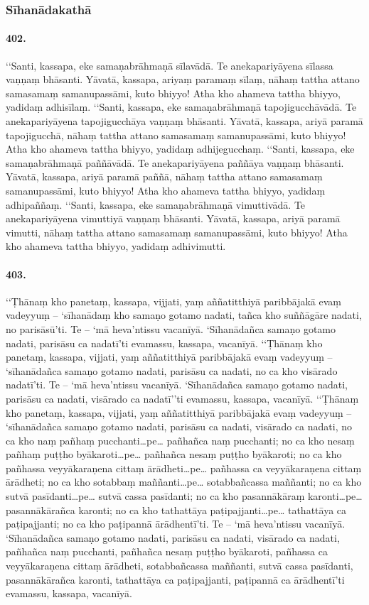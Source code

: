 \subsubsection{Sīhanādakathā}

\paragraph{402.} ‘‘Santi, kassapa, eke samaṇabrāhmaṇā sīlavādā. Te anekapariyāyena sīlassa vaṇṇaṃ bhāsanti. Yāvatā, kassapa, ariyaṃ paramaṃ sīlaṃ, nāhaṃ tattha attano samasamaṃ samanupassāmi, kuto bhiyyo! Atha kho ahameva tattha bhiyyo, yadidaṃ adhisīlaṃ. ‘‘Santi, kassapa, eke samaṇabrāhmaṇā tapojigucchāvādā. Te anekapariyāyena tapojigucchāya vaṇṇaṃ bhāsanti. Yāvatā, kassapa, ariyā paramā tapojigucchā, nāhaṃ tattha attano samasamaṃ samanupassāmi, kuto bhiyyo! Atha kho ahameva tattha bhiyyo, yadidaṃ adhijegucchaṃ. ‘‘Santi, kassapa, eke samaṇabrāhmaṇā paññāvādā. Te anekapariyāyena paññāya vaṇṇaṃ bhāsanti. Yāvatā, kassapa, ariyā paramā paññā, nāhaṃ tattha attano samasamaṃ samanupassāmi, kuto bhiyyo! Atha kho ahameva tattha bhiyyo, yadidaṃ adhipaññaṃ. ‘‘Santi, kassapa, eke samaṇabrāhmaṇā vimuttivādā. Te anekapariyāyena vimuttiyā vaṇṇaṃ bhāsanti. Yāvatā, kassapa, ariyā paramā vimutti, nāhaṃ tattha attano samasamaṃ samanupassāmi, kuto bhiyyo! Atha kho ahameva tattha bhiyyo, yadidaṃ adhivimutti.

\paragraph{403.} ‘‘Ṭhānaṃ kho panetaṃ, kassapa, vijjati, yaṃ aññatitthiyā paribbājakā evaṃ vadeyyuṃ – ‘sīhanādaṃ kho samaṇo gotamo nadati, tañca kho suññāgāre nadati, no parisāsū’ti. Te – ‘mā heva’ntissu vacanīyā. ‘Sīhanādañca samaṇo gotamo nadati, parisāsu ca nadatī’ti evamassu, kassapa, vacanīyā. ‘‘Ṭhānaṃ kho panetaṃ, kassapa, vijjati, yaṃ aññatitthiyā paribbājakā evaṃ vadeyyuṃ – ‘sīhanādañca samaṇo gotamo nadati, parisāsu ca nadati, no ca kho visārado nadatī’ti. Te – ‘mā heva’ntissu vacanīyā. ‘Sīhanādañca samaṇo gotamo nadati, parisāsu ca nadati, visārado ca nadatī’’ti evamassu, kassapa, vacanīyā. ‘‘Ṭhānaṃ kho panetaṃ, kassapa, vijjati, yaṃ aññatitthiyā paribbājakā evaṃ vadeyyuṃ – ‘sīhanādañca samaṇo gotamo nadati, parisāsu ca nadati, visārado ca nadati, no ca kho naṃ pañhaṃ pucchanti…pe… pañhañca naṃ pucchanti; no ca kho nesaṃ pañhaṃ puṭṭho byākaroti…pe… pañhañca nesaṃ puṭṭho byākaroti; no ca kho pañhassa veyyākaraṇena cittaṃ ārādheti…pe… pañhassa ca veyyākaraṇena cittaṃ ārādheti; no ca kho sotabbaṃ maññanti…pe… sotabbañcassa maññanti; no ca kho sutvā pasīdanti…pe… sutvā cassa pasīdanti; no ca kho pasannākāraṃ karonti…pe… pasannākārañca karonti; no ca kho tathattāya paṭipajjanti…pe… tathattāya ca paṭipajjanti; no ca kho paṭipannā ārādhentī’ti. Te – ‘mā heva’ntissu vacanīyā. ‘Sīhanādañca samaṇo gotamo nadati, parisāsu ca nadati, visārado ca nadati, pañhañca naṃ pucchanti, pañhañca nesaṃ puṭṭho byākaroti, pañhassa ca veyyākaraṇena cittaṃ ārādheti, sotabbañcassa maññanti, sutvā cassa pasīdanti, pasannākārañca karonti, tathattāya ca paṭipajjanti, paṭipannā ca ārādhentī’ti evamassu, kassapa, vacanīyā.


